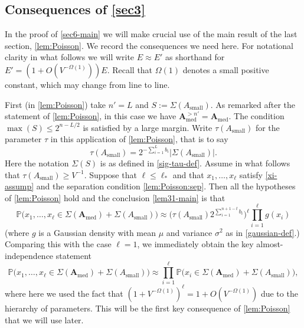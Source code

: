 \documentclass[11pt,reqno]{amsart}
\numberwithin{equation}{section}
\theoremstyle{definition}
\theoremstyle{remark}
\newcommand{\mb}{\mathbb}
\newcommand{\mbf}{\mathbf}
\renewcommand{\le}{\leqslant}
\renewcommand{\ge}{\geqslant}
\def\sml{\operatorname{small}}
\def\med{\operatorname{med}}
\begin{document}
\subsection{Consequences of \cref{sec3}} 
In the proof of \cref{sec6-main} we will make crucial use of the main result of the last section, \cref{lem:Poisson}. We record the consequences we need here.  For notational clarity in what follows we will write $E \approx E'$ as shorthand for $E' = (1 + O(V^{-\Omega(1)}))E$. Recall that $\Omega(1)$ denotes a small positive constant, which may change from line to line.

First (in \cref{lem:Poisson}) take $n' = L$ and $S := \Sigma(A_{\sml})$. As remarked after the statement of \cref{lem:Poisson}, in this case we have $\mbf{A}_{\med}^{> n'} = \mbf{A}_{\med}$. The condition $\max(S) \le 2^{n - L/2}$ is satisfied by a large margin. Write $\tau(A_{\sml})$ for the parameter $\tau$ in this application of \cref{lem:Poisson}, that is to say
\begin{equation}\label{tau-small} \tau(A_{\sml}) = 2^{-\sum_{i =1}^L b_i} |\Sigma(A_{\sml})|.\end{equation}
Here the notation $\Sigma(S)$ is as defined in \cref{sig-tau-def}.
Assume in what follows that $\tau(A_{\sml}) \ge V^{-1}$. Suppose that $\ell \le \ell_*$ and that $x_1,\dots, x_{\ell}$ satisfy \cref{xi-assump} and the separation condition \cref{lem:Poisson:sep}. Then all the hypotheses of \cref{lem:Poisson} hold and the conclusion \cref{lem31-main} is that
\begin{equation}\label{poss-asmall}
\mb{P}\big(x_1,\dots, x_{\ell} \in \Sigma(\mbf{A}_{\med}) + \Sigma(A_{\sml})\big) \approx \big(\tau(A_{\sml}) 2^{\sum_{i=1}^{n + 1 - t} b_i} \big)^{\ell} \prod_{i = 1}^{\ell} g(x_i)
\end{equation}
(where $g$ is a Gaussian density with mean $\mu$ and variance $\sigma^2$ as in \cref{gaussian-def}.)
Comparing this with the case $\ell = 1$, we immediately obtain the key almost-independence statement
\begin{equation}\label{almost-indep-statement}
\mb{P}\big(x_1,\dots, x_{\ell} \in \Sigma(\mbf{A}_{\med}) + \Sigma(A_{\sml})\big) \approx \prod_{i = 1}^{\ell} \mb{P}\big(x_i \in \Sigma(\mbf{A}_{\med}) + \Sigma(A_{\sml})\big),
\end{equation} where here we used the fact that $(1 + V^{-\Omega(1)})^{\ell} = 1 + O(V^{-\Omega(1)})$ due to the hierarchy of parameters. This will be the first key consequence of \cref{lem:Poisson} that we will use later.
\end{document}
